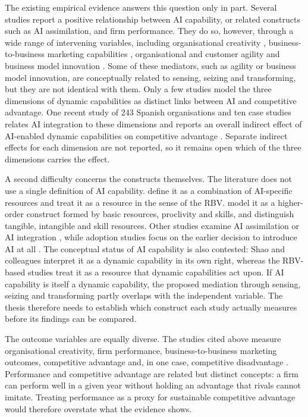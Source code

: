 The existing empirical evidence answers this question only in part. Several studies report a positive relationship between AI capability, or related constructs such as AI assimilation, and firm performance. They do so, however, through a wide range of intervening variables, including organisational creativity \parencite{mikalef2021ai, chen2022}, business-to-business marketing capabilities \parencite{mikalef2023}, organisational and customer agility \parencite{fossowamba2022} and business model innovation \parencite{shao2026}. Some of these mediators, such as agility or business model innovation, are conceptually related to sensing, seizing and transforming, but they are not identical with them. Only a few studies model the three dimensions of dynamic capabilities as distinct links between AI and competitive advantage. One recent study of 243 Spanish organisations and ten case studies relates AI integration to these dimensions and reports an overall indirect effect of AI-enabled dynamic capabilities on competitive advantage \parencite{selgascors2026}. Separate indirect effects for each dimension are not reported, so it remains open which of the three dimensions carries the effect.

A second difficulty concerns the constructs themselves. The literature does not use a single definition of AI capability. \textcite{mikalef2021ai} define it as a combination of AI-specific resources and treat it as a resource in the sense of the RBV. \textcite{chen2022} model it as a higher-order construct formed by basic resources, proclivity and skills, and \textcite{shao2026} distinguish tangible, intangible and skill resources. Other studies examine AI assimilation \parencite{fossowamba2022} or AI integration \parencite{selgascors2026}, while adoption studies focus on the earlier decision to introduce AI at all \parencite{chatterjee2021}. The conceptual status of AI capability is also contested: Shao and colleagues interpret it as a dynamic capability in its own right, whereas the RBV-based studies treat it as a resource that dynamic capabilities act upon. If AI capability is itself a dynamic capability, the proposed mediation through sensing, seizing and transforming partly overlaps with the independent variable. The thesis therefore needs to establish which construct each study actually measures before its findings can be compared.

The outcome variables are equally diverse. The studies cited above measure organisational creativity, firm performance, business-to-business marketing outcomes, competitive advantage and, in one case, competitive disadvantage \parencite{mikalef2021ai, mikalef2023, shao2026, rana2022}. Performance and competitive advantage are related but distinct concepts: a firm can perform well in a given year without holding an advantage that rivals cannot imitate. Treating performance as a proxy for sustainable competitive advantage would therefore overstate what the evidence shows.

